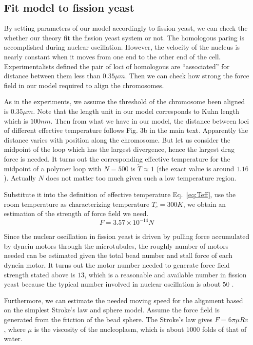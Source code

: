 \documentclass{article}
\begin{document}
\subsection{Fit model to fission yeast}
\label{sub:fit}
By setting parameters of our model accordingly to fission yeast, we can check the whether our theory fit the fission yeast system or not.
The homologous paring is accomplished during nuclear oscillation. However, the velocity of the nucleus is nearly constant when it moves from one end to the other end of the cell\cite{Vogel2009}.
Experimentalists defined the pair of loci of homologous are ``associated'' for distance between them less than $0.35\mu m$\cite{Ding2004}. Then we can check how strong the force field in our model required to align the chromosomes.

As in the experiments, we assume the threshold of the chromosome been aligned is $0.35\mu m$. Note that the length unit in our model corresponds to Kuhn length which is $100nm$.
Then from what we have in our model, the distance between loci of different effective temperature follows Fig. 3b in the main text.
Apparently the distance varies with position along the chromosome. 
But let us consider the midpoint of the loop which has the largest divergence, hence the largest drag force is needed.
It turns out the corresponding effective temperature for the midpoint of a polymer loop with $N=500$ is $\tilde{T}\approx 1$ (the exact value is around $1.16$). 
Actually $N$ does not matter too much given such a low temperature region. 

Substitute it into the definition of effective temperature Eq.~\ref{eq:Teff}, use the room temperature as characterizing temperature $T_c = 300K$, we obtain an estimation of the strength of force field we need.
\begin{equation}
	F = 3.57\times10^{-14} N
\end{equation}

Since the nuclear oscillation in fission yeast is driven by pulling force accumulated by dynein motors through the microtubules, the roughly number of motors needed can be estimated given the total bead number and stall force of each dynein motor.
It turns out the motor number needed to generate force field strength stated above is $13$, which is a reasonable and available number in fission yeast because the typical number involved in nuclear oscillation is about $50$ \cite{Vogel2009}.

Furthermore, we can estimate the needed moving speed for the alignment based on the simplest Stroke's law and sphere model. 
Assume the force field is generated from the friction of the bead sphere. 
The Stroke's law gives $F= 6\pi \mu R v$, where $\mu$ is the viscosity of the nucleoplasm, which is about $1000$ folds of that of water.
\end{document}

